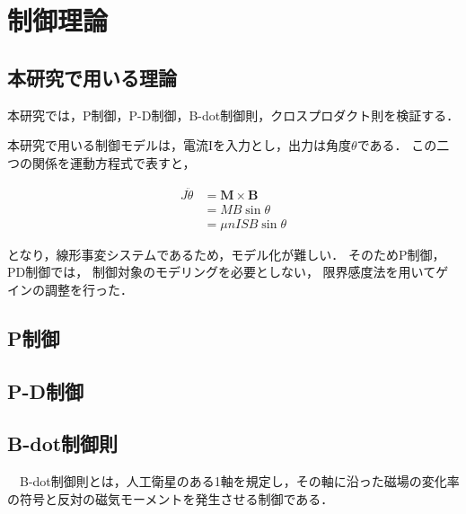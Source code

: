 \section{制御理論}

\subsection{本研究で用いる理論}
本研究では，P制御，P-D制御，B-dot制御則，クロスプロダクト則を検証する．

本研究で用いる制御モデルは，電流Iを入力とし，出力は角度$\theta$である．
この二つの関係を運動方程式で表すと，

\begin{equation}
    \begin{aligned}
        J\ddot{\theta} &= \boldsymbol{M \times B}\\
                       &= MB\sin\theta\\
                       &= \mu nISB\sin\theta
    \end{aligned}
\end{equation}

となり，線形事変システムであるため，モデル化が難しい．
そのためP制御，PD制御では，
制御対象のモデリングを必要としない，
限界感度法を用いてゲインの調整を行った．



\subsection{P制御}




\subsection{P-D制御}
\newpage
\subsection{B-dot制御則}
　B-dot制御則とは，人工衛星のある1軸を規定し，その軸に沿った磁場の変化率の符号と反対の磁気モーメントを発生させる制御である．

